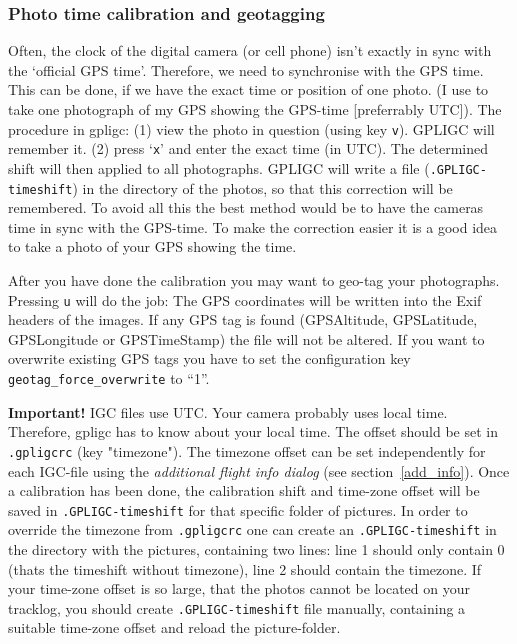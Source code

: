 \subsubsection{Photo time calibration and geotagging}
\label{photo_time}
Often, the clock of the digital camera (or cell phone) isn't exactly in sync with the `official GPS time'.
Therefore, we need to synchronise with the GPS time.
This can be done, if we have the exact time or position of one photo.
(I use to take one photograph of my GPS showing the GPS-time [preferrably UTC]).
The procedure in gpligc: (1) view the photo in question (using key \texttt{v}).
GPLIGC will remember it. (2) press `\texttt{x}' and enter the exact time (in UTC).
The determined shift will then applied to all photographs.
GPLIGC will write a file (\texttt{.GPLIGC-timeshift}) in the directory of the photos, so that this correction will be remembered.
To avoid all this the best method would be to have the cameras time in sync with the GPS-time. To make the correction easier it is a good idea to take a photo of your GPS showing the time.

After you have done the calibration you may want to geo-tag your photographs. Pressing \texttt{u} will do the job: The GPS coordinates will be written into the Exif headers of the images.
If any GPS tag is found (GPSAltitude, GPSLatitude, GPSLongitude or GPSTimeStamp) the file will not be altered.
If you want to overwrite existing GPS tags you have to set the configuration key \texttt{geotag\_force\_overwrite} to ``1''.


\textbf{Important!}  IGC files use UTC. Your camera probably uses local time. Therefore, gpligc has to know about your local time. The offset should be set in \texttt{.gpligcrc} (key "timezone"). The timezone offset can be set independently for each IGC-file using the \emph{additional flight info dialog} (see section~\ref{add_info}).
Once a calibration has been done, the calibration shift and time-zone offset will be saved in \texttt{.GPLIGC-timeshift} for that specific folder of pictures. In order to override the timezone from \texttt{.gpligcrc} one can create an \texttt{.GPLIGC-timeshift} in the directory with the pictures, containing two lines: line 1 should only contain 0 (thats the timeshift without timezone), line 2 should contain the timezone.
If your time-zone offset is so large, that the photos cannot be located on your tracklog, you should create \texttt{.GPLIGC-timeshift} file manually, containing a suitable time-zone offset and reload the picture-folder.


